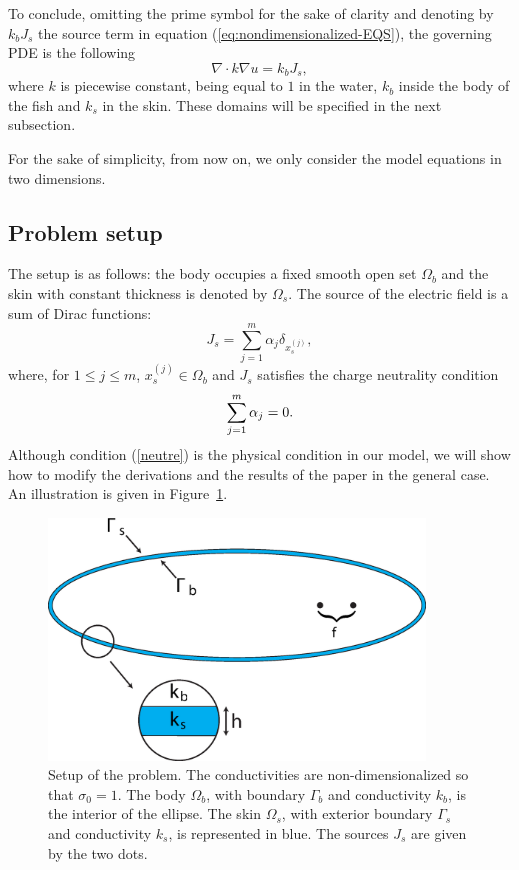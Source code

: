 To conclude, omitting the prime symbol for the sake of clarity and
denoting by $k_b J_s$ the source term in equation
(\ref{eq:nondimensionalized-EQS}), the governing PDE is the
following
\begin{equation}
\nabla\cdot k\nabla u= k_b J_s,\label{eq:EQS-final}
\end{equation}
 where $k$ is piecewise constant, being equal to $1$ in the water,
$k_{b}$ inside the body of the fish and $k_{s}$ in the skin. These
domains will be specified in the next subsection.

For the sake of simplicity, from now on, we only consider  the
model equations in two dimensions.

\subsection{Problem setup} \label{problemsetup}

The setup is as follows: the body occupies a fixed smooth open set
$\Omega_{b}$ and the skin with constant thickness is denoted by
$\Omega_{s}$.
 The source of the electric field is a sum of Dirac functions:
\begin{equation} \label{sumdirac}
J_s= \sum_{j=1}^{m}\alpha_{j}\delta_{x_s^{(j)}},
\end{equation}
 where, for $1\leq j\leq m$, $x_s^{(j)}\in\Omega_{b}$ and $J_s$ satisfies
 the charge neutrality condition
\begin{equation} \label{neutre}
\displaystyle \sum_{j=1}^m \alpha_{j}=0.
\end{equation}
Although condition (\ref{neutre}) is the physical condition in our
model, we will show how to modify the derivations and the results
of the paper in the general case. An illustration is given in
Figure~\ref{fig:Setup}.
\begin{figure}
\centering\includegraphics[width=10cm]{model/fish_model.eps}
\caption{Setup of the problem. The conductivities are
non-dimensionalized so that $\sigma_{0}=1$. The body $\Omega_{b}$,
with boundary $\Gamma_b$ and conductivity $k_b$, is the interior
of the ellipse. The skin $\Omega_{s}$, with exterior boundary
$\Gamma_s$ and conductivity $k_s$, is represented in blue. The
sources $J_s$ are given by the two dots. \label{fig:Setup}}
\end{figure}


